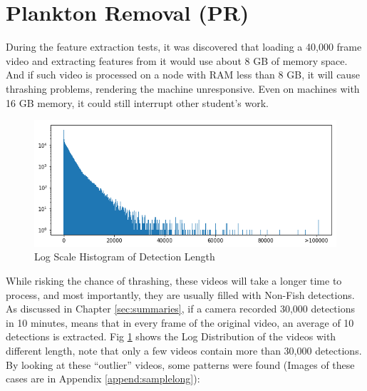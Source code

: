 \documentclass[bsc,frontabs,twoside,fullspacing,parskip,deptreport]{infthesis}
\begin{document}
\section{Plankton Removal (PR)}
\label{sec:earlyremove}

During the feature extraction tests, it was discovered that loading a 40,000 frame video and extracting features from it would use about 8 GB of memory space. 
And if such video is processed on a node with RAM less than 8 GB, it will cause thrashing problems, rendering the machine unresponsive. 
Even on machines with 16 GB memory, it could still interrupt other student's work.

\begin{figure}[ht]
\centering
    \includegraphics[scale=0.45]{graph/frame_distribution.png}
    \caption{Log Scale Histogram of Detection Length}
    \label{fig:vidlength}
\end{figure}

While risking the chance of thrashing, these videos will take a longer time to process, and most importantly, they are usually filled with Non-Fish detections. 
As discussed in Chapter \ref{sec:summaries}, if a camera recorded 30,000 detections in 10 minutes, means that in every frame of the original video, an average of 10 detections is extracted. 
Fig \ref{fig:vidlength} shows the Log Distribution of the videos with different length, note that only a few videos contain more than 30,000 detections. 
By looking at these ``outlier'' videos, some patterns were found (Images of these cases are in Appendix \ref{append:samplelong}):
\end{document}
